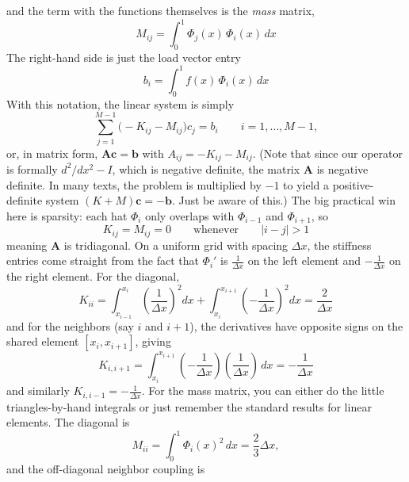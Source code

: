 and the term with the functions themselves is the \emph{mass} matrix,
\begin{equation}
    M_{ij} = \int_0^1 \Phi_j(x)\,\Phi_i(x)\,dx
\end{equation}
The right-hand side is just the load vector entry
\begin{equation}
    b_i = \int_0^1 f(x)\,\Phi_i(x)\,dx
\end{equation}
With this notation, the linear system is simply
\begin{equation}
    \sum_{j=1}^{M-1}\bigl(-K_{ij}-M_{ij}\bigr)c_j = b_i
    \qquad i=1,\dots,M-1,
\end{equation}
or, in matrix form, $\mathbf{A}\mathbf{c}=\mathbf{b}$ with $A_{ij}=-K_{ij}-M_{ij}$. (Note that since our operator is formally $d^2/dx^2 - I$, which is negative definite, the matrix $\mathbf{A}$ is negative definite. In many texts, the problem is multiplied by $-1$ to yield a positive-definite system $(K+M)\mathbf{c} = -\mathbf{b}$. Just be aware of this.) The big practical win here is sparsity: each hat $\Phi_i$ only overlaps with $\Phi_{i-1}$ and $\Phi_{i+1}$, so
\begin{equation}
    K_{ij}=M_{ij}=0\qquad\text{whenever}\qquad |i-j|>1
\end{equation}
meaning $\mathbf{A}$ is tridiagonal. On a uniform grid with spacing $\Delta x$, the stiffness entries come straight from the fact that $\Phi_i'$ is $\frac{1}{\Delta x}$ on the left element and $-\frac{1}{\Delta x}$ on the right element. For the diagonal,
\begin{equation}
    K_{ii}
    = \int_{x_{i-1}}^{x_i}\left(\frac{1}{\Delta x}\right)^2 dx
      + \int_{x_i}^{x_{i+1}}\left(-\frac{1}{\Delta x}\right)^2 dx
    = \frac{2}{\Delta x}
\end{equation}
and for the neighbors (say $i$ and $i+1$), the derivatives have opposite signs on the shared element $[x_i,x_{i+1}]$, giving
\begin{equation}
    K_{i,i+1}
    = \int_{x_i}^{x_{i+1}}\left(-\frac{1}{\Delta x}\right)\left(\frac{1}{\Delta x}\right)\,dx
    = -\frac{1}{\Delta x}
\end{equation}
and similarly $K_{i,i-1}=-\frac{1}{\Delta x}$. For the mass matrix, you can either do the little triangles-by-hand integrals or just remember the standard results for linear elements. The diagonal is
\begin{equation}
    M_{ii} = \int_0^1 \Phi_i(x)^2\,dx = \frac{2}{3}\Delta x,
\end{equation}
and the off-diagonal neighbor coupling is
